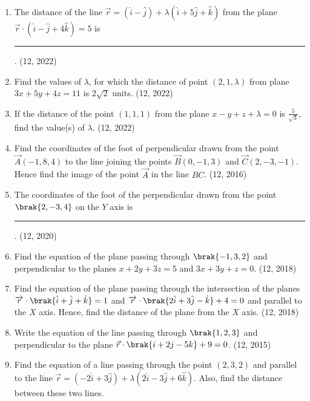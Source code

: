 \begin{enumerate}[label=\thesubsection.\arabic*, ref=\thesubsection.\theenumi]
\item The distance of the line
	$	\vec{r}=(\hat{i}-\hat{j})+\lambda(\hat{i}+5\hat{j}+\hat{k})$
	from the plane
		$\vec{r}\cdot(\hat{i}-\hat{j}+4\hat{k})=5$
	is
\rule{1cm}{0.1pt}.
\hfill (12, 2022)

\item Find the values of $\lambda$, for which the distance of point $(2,1,\lambda)$ from plane $3x+5y+4z=11$ is $2\sqrt{2}$ units. \hfill (12, 2022)
\item If the distance of the point $(1,1,1)$ from the plane $x-y+z+\lambda=0$ is $\frac{5}{\sqrt{3}}$, find the value(s) of $\lambda$. \hfill (12, 2022)
\item Find the coordinates of the foot of perpendicular drawn from the point
      $\vec{A}(-1, 8, 4)$ to the line joining the points $\vec{B}(0, -1, 3)$ and $\vec{C}(2,-3,-1)$. Hence
      find the image of the point $\vec{A}$ in the line $BC$. \hfill (12, 2016)
\item The coordinates of the foot of the perpendicular drawn from the point $\brak{2,-3,4}$ on the $Y$ axis is
\rule{1cm}{0.1pt}.
\hfill (12, 2020)
\item Find the equation of the plane passing through $\brak{-1,3,2}$ and perpendicular to the planes $x+2y+3z=5$ and $3x+3y+z=0$.
\hfill (12, 2018)
\item Find the equation of the plane passing through the intersection of the planes 
$	\overrightarrow{{r}} \cdot \brak{\hat{i} + \hat{j} + \hat{k}} = 1$
and 
$	\overrightarrow{{r}} \cdot \brak{2\hat{i} + 3\hat{j} - \hat{k} } + 4 = 0$
and parallel to the $X$ axis. Hence, find the distance of the plane from the $X$ axis.
\hfill (12, 2018)
\item Write the equation of the line passing through $\brak{1,2,3}$ and perpendicular to the plane $\vec{r}\cdot\brak{{i}+2{j}-5{k}}+9=0$. \hfill (12, 2015)
	\item Find the  equation of a line passing through the point $(2, 3, 2)$ and parallel to the line $\overrightarrow{r} = (-2\hat{i} + 3\hat{j}) + \lambda (2\hat{i} - 3\hat{j} + 6\hat{k})$. Also, find the distance between these two lines.


\end{enumerate}
